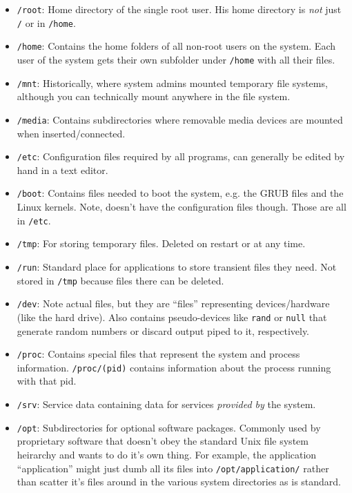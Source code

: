 \documentclass[12pt]{article}
\theoremstyle{plain}
\theoremstyle{definition}
\theoremstyle{remark}
\begin{document}
\begin{itemize}
  \item \texttt{/root}:
    Home directory of the single root user.
    His home directory is \emph{not} just \texttt{/} or in
    \texttt{/home}.

  \item \texttt{/home}:
    Contains the home folders of all non-root users on the system.
    Each user of the system gets their own subfolder under
    \texttt{/home} with all their files.
  \item \texttt{/mnt}:
    Historically, where system admins mounted temporary file systems,
    although you can technically mount anywhere in the file system.
  \item \texttt{/media}:
    Contains subdirectories where removable media devices are mounted
    when inserted/connected.
  \item \texttt{/etc}:
    Configuration files required by all programs, can generally be
    edited by hand in a text editor.
  \item \texttt{/boot}:
    Contains files needed to boot the system, e.g. the GRUB files and
    the Linux kernels.
    Note, doesn't have the configuration files though. Those are all in
    \texttt{/etc}.
  \item \texttt{/tmp}:
    For storing temporary files. Deleted on restart or at any time.
  \item \texttt{/run}:
    Standard place for applications to store transient files they need.
    Not stored in \texttt{/tmp} because files there can be deleted.
  \item \texttt{/dev}:
    Note actual files, but they are ``files'' representing
    devices/hardware (like the hard drive).
    Also contains pseudo-devices like \texttt{rand} or \texttt{null}
    that generate random numbers or discard output piped to it,
    respectively.
  \item \texttt{/proc}:
    Contains special files that represent the system and process
    information.
    \texttt{/proc/(pid)} contains information about the process running
    with that pid.

  \item \texttt{/srv}: Service data containing data for services
    \emph{provided by} the system.
  \item \texttt{/opt}:
    Subdirectories for optional software packages.
    Commonly used by proprietary software that doesn't obey the standard
    Unix file system heirarchy and wants to do it's own thing.
    For example, the application ``application'' might just dumb all
    its files into \texttt{/opt/application/} rather than scatter it's
    files around in the various system directories as is standard.
\end{itemize}
\end{document}
